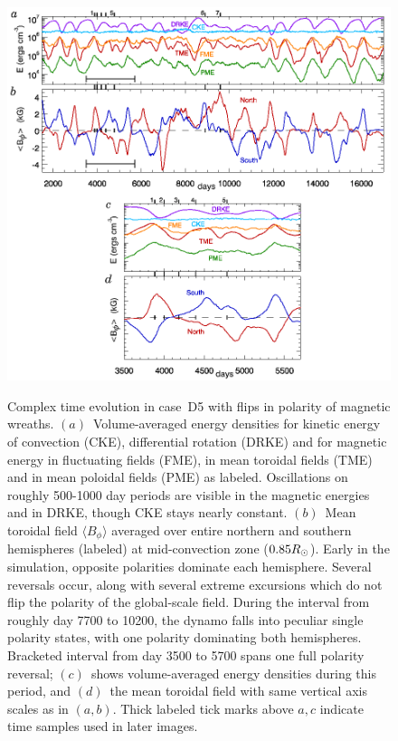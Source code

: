 \begin{figure}
  \begin{center}
    \includegraphics[width=0.8\linewidth]{figs/chapter_6/Figure_7/Figure_7b.eps}\\
  \end{center}
  \caption[Complex time evolution in case~D5 with flips in polarity of magnetic wreaths]
    {Complex time evolution in case~D5 with flips in polarity of magnetic wreaths. 
    $(a)$~Volume-averaged energy densities for kinetic
    energy of convection (CKE), differential rotation (DRKE) and for
    magnetic energy in fluctuating fields (FME), in mean toroidal fields
    (TME) and in mean poloidal fields (PME) as labeled.  Oscillations on
    roughly 500-1000 day periods are visible in the magnetic energies
    and in DRKE, though CKE stays nearly constant.  
    $(b)$~Mean toroidal field $\langle B_\phi \rangle$ averaged over entire northern and
    southern hemispheres (labeled) at mid-convection zone ($0.85 R_\odot$).
    Early in the simulation, opposite polarities dominate each
    hemisphere.  Several reversals occur, along with several extreme
    excursions which do not flip the polarity of the global-scale field.
    During the interval from roughly day 7700 to 10200, 
    the dynamo falls into peculiar single
    polarity states, with one polarity dominating both hemispheres.
    Bracketed interval from day 3500 to 5700 spans one full polarity
    reversal; $(c)$~shows volume-averaged energy densities during
    this period, and $(d)$~the mean toroidal field with same vertical
    axis scales as in $(a,b)$.   Thick labeled tick marks above $a,c$
    indicate time samples used in later images. 
  \label{fig:case_D5_energies}} 
\end{figure}


